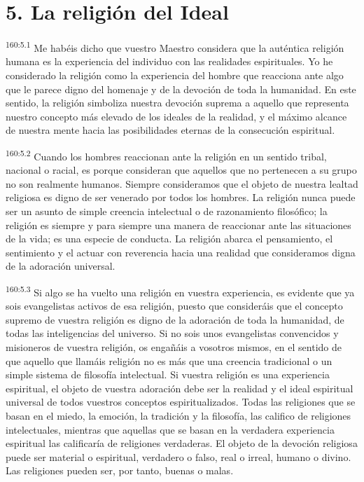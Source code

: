 \section*{5. La religión del Ideal}
\par 
\textsuperscript{160:5.1} Me habéis dicho que vuestro Maestro considera que la auténtica religión humana es la experiencia del individuo con las realidades espirituales. Yo he considerado la religión como la experiencia del hombre que reacciona ante algo que le parece digno del homenaje y de la devoción de toda la humanidad. En este sentido, la religión simboliza nuestra devoción suprema a aquello que representa nuestro concepto más elevado de los ideales de la realidad, y el máximo alcance de nuestra mente hacia las posibilidades eternas de la consecución espiritual.

\par 
\textsuperscript{160:5.2} Cuando los hombres reaccionan ante la religión en un sentido tribal, nacional o racial, es porque consideran que aquellos que no pertenecen a su grupo no son realmente humanos. Siempre consideramos que el objeto de nuestra lealtad religiosa es digno de ser venerado por todos los hombres. La religión nunca puede ser un asunto de simple creencia intelectual o de razonamiento filosófico; la religión es siempre y para siempre una manera de reaccionar ante las situaciones de la vida; es una especie de conducta. La religión abarca el pensamiento, el sentimiento y el actuar con reverencia hacia una realidad que consideramos digna de la adoración universal.

\par 
\textsuperscript{160:5.3} Si algo se ha vuelto una religión en vuestra experiencia, es evidente que ya sois evangelistas activos de esa religión, puesto que consideráis que el concepto supremo de vuestra religión es digno de la adoración de toda la humanidad, de todas las inteligencias del universo. Si no sois unos evangelistas convencidos y misioneros de vuestra religión, os engañáis a vosotros mismos, en el sentido de que aquello que llamáis religión no es más que una creencia tradicional o un simple sistema de filosofía intelectual. Si vuestra religión es una experiencia espiritual, el objeto de vuestra adoración debe ser la realidad y el ideal espiritual universal de todos vuestros conceptos espiritualizados. Todas las religiones que se basan en el miedo, la emoción, la tradición y la filosofía, las califico de religiones intelectuales, mientras que aquellas que se basan en la verdadera experiencia espiritual las calificaría de religiones verdaderas. El objeto de la devoción religiosa puede ser material o espiritual, verdadero o falso, real o irreal, humano o divino. Las religiones pueden ser, por tanto, buenas o malas.

